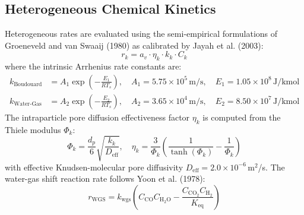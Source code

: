 \documentclass[11pt,a4paper]{article}
\begin{document}
\subsection{Heterogeneous Chemical Kinetics}
Heterogeneous rates are evaluated using the semi-empirical formulations of Groeneveld and van Swaaij (1980) as calibrated by Jayah et al. (2003):
\begin{equation}
    r_k = a_v \cdot \eta_k \cdot k_k \cdot C_k
\end{equation}
where the intrinsic Arrhenius rate constants are:
\begin{align}
    k_{\text{Boudouard}} &= A_1 \exp\left(-\frac{E_1}{R T_s}\right), \quad A_1 = 5.75 \times 10^5\,\text{m/s}, \quad E_1 = 1.05 \times 10^8\,\text{J/kmol} \\
    k_{\text{Water-Gas}} &= A_2 \exp\left(-\frac{E_2}{R T_s}\right), \quad A_2 = 3.65 \times 10^4\,\text{m/s}, \quad E_2 = 8.50 \times 10^7\,\text{J/kmol}
\end{align}
The intraparticle pore diffusion effectiveness factor $\eta_k$ is computed from the Thiele modulus $\Phi_k$:
\begin{equation}
    \Phi_k = \frac{d_p}{6} \sqrt{\frac{k_k}{D_{\text{eff}}}}, \quad \eta_k = \frac{3}{\Phi_k} \left(\frac{1}{\tanh(\Phi_k)} - \frac{1}{\Phi_k}\right)
\end{equation}
with effective Knudsen-molecular pore diffusivity $D_{\text{eff}} = 2.0 \times 10^{-6}$\,m$^2$/s. The water-gas shift reaction rate follows Yoon et al. (1978):
\begin{equation}
    r_{\text{WGS}} = k_{\text{wgs}} \left(C_{\text{CO}} C_{\text{H}_2\text{O}} - \frac{C_{\text{CO}_2} C_{\text{H}_2}}{K_{\text{eq}}}\right)
\end{equation}
\end{document}
